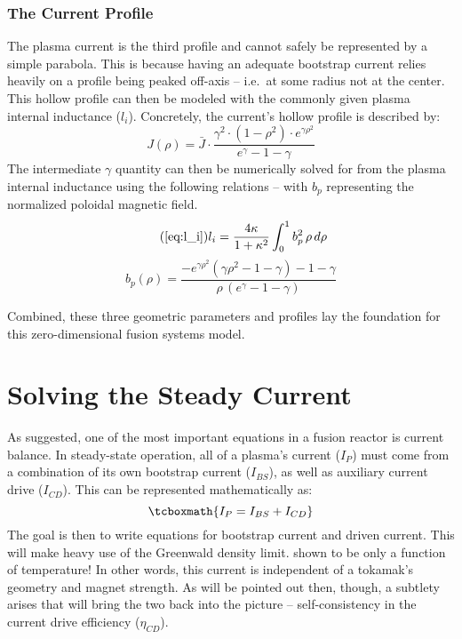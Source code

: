 \subsubsection{The Current  Profile}

The plasma current  is the third profile and cannot safely be represented by a simple parabola. This is because having an adequate bootstrap current relies heavily on a profile being peaked off-axis -- i.e.\ at some radius not at the center. This hollow profile can then be modeled with the commonly given plasma internal inductance ($l_i$). Concretely, the current's hollow profile is described by:
\begin{equation}
	J(\rho) = \bar{J} \cdot \frac{ \gamma ^ 2 \cdot ( 1 - \rho ^ 2 ) \cdot e^{ \gamma \rho^2 } }{ e^\gamma - 1 - \gamma}
\end{equation}
The intermediate $\gamma$ quantity can then be numerically solved for from the plasma internal inductance using the following relations -- with $b_p$ representing the normalized poloidal magnetic field. 
\begin{equation}
	\tag{\ref{eq:l_i}}
	l_i = \frac{4 \kappa}{1+\kappa^2}	 \int_0^1 b_p^2 \, \rho \, d\rho
\end{equation}
\begin{equation}
	\label{eq:b_p}
	b_p(\rho) = \frac{ -e^{\gamma\rho^2} ( \gamma\rho^2 - 1 - \gamma ) - 1 - \gamma }{\rho \,( e^\gamma - 1 - \gamma ) }
\end{equation}

Combined, these three geometric parameters and profiles lay the foundation for this zero-dimensional fusion systems model.

\section{Solving the Steady Current}

As suggested, one of the most important equations in a fusion reactor is current balance. In steady-state operation, all of a plasma's current ($I_P$) must come from a combination of its own bootstrap current ($I_{BS}$), as well as auxiliary current drive ($I_{CD}$). This can be represented mathematically as:
\begin{equation}
	\label{eq:ibal}
	\tcboxmath{
	I_P = I_{BS} + I_{CD}
	}
\end{equation}
The goal is then to write equations for bootstrap current and driven current. This will make heavy use of the Greenwald density limit.  shown to be only a function of temperature! In other words, this current is independent of a tokamak's geometry and magnet strength. As will be pointed out then, though, a subtlety arises that will bring the two back into the picture -- self-consistency in the current drive efficiency ($\eta_{CD}$).


